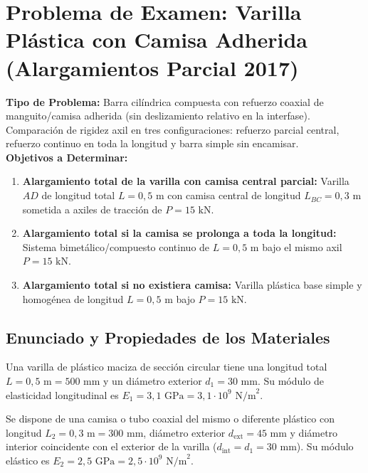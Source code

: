 \section{Problema de Examen: Varilla Plástica con Camisa Adherida (Alargamientos Parcial 2017)}

\begin{tcolorbox}[colback=white, colframe=myb!80!black, arc=4pt, boxrule=0.9pt, left=8pt, right=8pt, top=7pt, bottom=7pt]
    \textbf{Tipo de Problema:} Barra cilíndrica compuesta con refuerzo coaxial de manguito/camisa adherida (sin deslizamiento relativo en la interfase). Comparación de rigidez axil en tres configuraciones: refuerzo parcial central, refuerzo continuo en toda la longitud y barra simple sin encamisar.\\
    \textbf{Objetivos a Determinar:}
    \begin{enumerate}[label=\alph*)]
        \item \textbf{Alargamiento total de la varilla con camisa central parcial:} Varilla $AD$ de longitud total $L = 0{,}5\text{ m}$ con camisa central de longitud $L_{BC} = 0{,}3\text{ m}$ sometida a axiles de tracción de $P = 15\text{ kN}$.
        \item \textbf{Alargamiento total si la camisa se prolonga a toda la longitud:} Sistema bimetálico/compuesto continuo de $L = 0{,}5\text{ m}$ bajo el mismo axil $P = 15\text{ kN}$.
        \item \textbf{Alargamiento total si no existiera camisa:} Varilla plástica base simple y homogénea de longitud $L = 0{,}5\text{ m}$ bajo $P = 15\text{ kN}$.
    \end{enumerate}
\end{tcolorbox}

\subsection{Enunciado y Propiedades de los Materiales}

Una varilla de plástico maciza de sección circular tiene una longitud total $L = 0{,}5\text{ m} = 500\text{ mm}$ y un diámetro exterior $d_1 = 30\text{ mm}$. Su módulo de elasticidad longitudinal es $E_1 = 3{,}1\text{ GPa} = 3{,}1 \cdot 10^9\text{ N/m}^2$.

Se dispone de una camisa o tubo coaxial del mismo o diferente plástico con longitud $L_2 = 0{,}3\text{ m} = 300\text{ mm}$, diámetro exterior $d_{\text{ext}} = 45\text{ mm}$ y diámetro interior coincidente con el exterior de la varilla ($d_{\text{int}} = d_1 = 30\text{ mm}$). Su módulo elástico es $E_2 = 2{,}5\text{ GPa} = 2{,}5 \cdot 10^9\text{ N/m}^2$.

